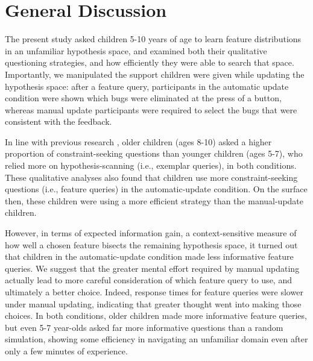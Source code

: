 \documentclass[man,floatsintext]{apa6}
\begin{document}

\section{General Discussion}
The present study asked children 5-10 years of age to learn feature distributions in an unfamiliar hypothesis space, and examined both their qualitative questioning strategies, and how efficiently they were able to search that space. Importantly, we manipulated the support children were 
given while updating the hypothesis space: after a feature query, participants in the 
automatic update condition were shown which bugs were eliminated at the press of 
a button, whereas manual update participants were required to select the bugs that 
were consistent with the feedback. 

In line with previous research \cite{Mosher:1966,Ruggeri:2014}, older children (ages 8-10) asked a higher proportion of constraint-seeking questions than younger children (ages 5-7), who relied more on hypothesis-scanning (i.e., exemplar queries), in both conditions. These qualitative analyses also found that children use more constraint-seeking questions (i.e., feature queries) in the automatic-update condition. On the surface then, these children were using a more efficient strategy than the manual-update children. 

However, in terms of expected information gain, a context-sensitive measure of how well a chosen feature bisects the remaining hypothesis space, it turned out that children in the 
automatic-update condition made less informative feature queries. We 
suggest that the greater mental effort required by manual updating actually lead 
to more careful consideration of which feature query to use, and ultimately a better choice. Indeed, response times for feature queries were slower under manual updating, indicating that greater thought went into making those choices. In both conditions, older children made more informative feature queries, but even 5-7 year-olds asked far more informative questions than a random simulation, showing some efficiency in navigating an unfamiliar domain even after only a few minutes of experience. 
\end{document}
